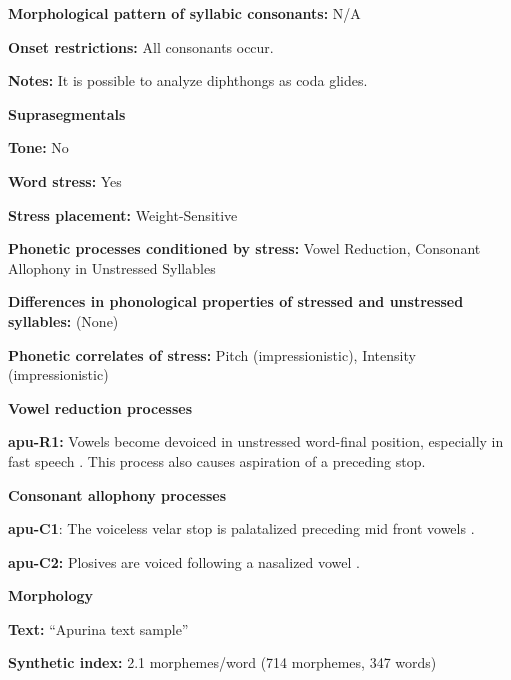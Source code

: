 \textbf{Morphological pattern of syllabic consonants:} N/A



\textbf{Onset restrictions:} All consonants occur.



\textbf{Notes:} It is possible to analyze diphthongs as coda glides.



\textbf{Suprasegmentals}



\textbf{Tone:} No



\textbf{Word stress:} Yes



\textbf{Stress placement:} Weight-Sensitive



\textbf{Phonetic processes conditioned by stress:} Vowel Reduction, Consonant Allophony in Unstressed Syllables



\textbf{Differences in phonological properties of stressed and unstressed syllables:} (None)



\textbf{Phonetic correlates of stress:} Pitch (impressionistic), Intensity (impressionistic)



\textbf{Vowel reduction processes}



\textbf{apu-R1:} Vowels become devoiced in unstressed word-final position, especially in fast speech \citep[60-1]{Facundes2000}. This process also causes aspiration of a preceding stop.



\textbf{Consonant allophony processes}



\textbf{apu-C1}: The voiceless velar stop is palatalized preceding mid front vowels \citep[76]{Facundes2000}.



\textbf{apu-C2:} Plosives are voiced following a nasalized vowel \citep[73]{Facundes2000}.



\textbf{Morphology}



\textbf{Text:} “Apurina text sample” \citep[625-642]{Facundes2000}



\textbf{Synthetic index:} 2.1 morphemes/word (714 morphemes, 347 words)



